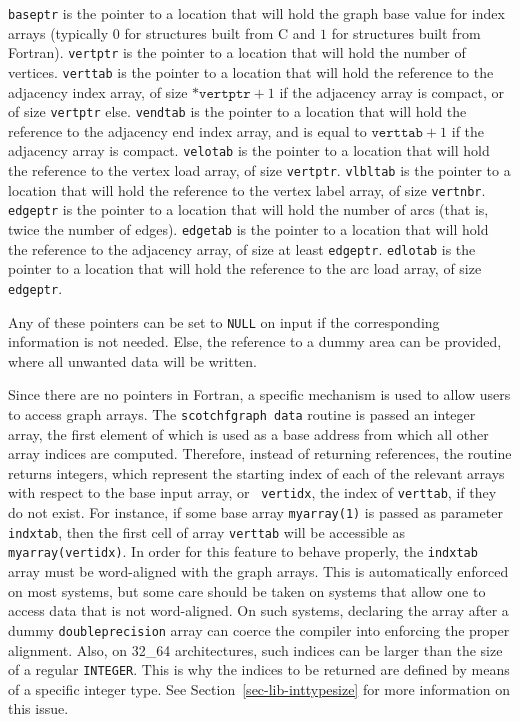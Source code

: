 \begin{itemize}
{\tt baseptr} is the pointer to a location that will hold the graph base
value for index arrays (typically $0$ for
structures built from C and $1$ for structures built from Fortran).
{\tt vertptr} is the pointer to a location that will hold the number of
vertices.
{\tt verttab} is the pointer to a location that will hold the reference to
the adjacency index array, of size $\mathtt{*vertptr} + 1$ if the
adjacency array is compact, or of size {\tt *vertptr} else.
{\tt vendtab} is the pointer to a location that will hold the reference to
the adjacency end index array, and is equal to $\mathtt{verttab} +
1$ if the adjacency array is compact.
{\tt velotab} is the pointer to a location that will hold the reference to
the vertex load array, of size {\tt *vertptr}.
{\tt vlbltab} is the pointer to a location that will hold the reference to
the vertex label array, of size {\tt vertnbr}.
{\tt edgeptr} is the pointer to a location that will hold the number of arcs
(that is, twice the number of edges).
{\tt edgetab} is the pointer to a location that will hold the reference to
the adjacency array, of size at least {\tt *edgeptr}.
{\tt edlotab} is the pointer to a location that will hold the reference to
the arc load array, of size {\tt *edgeptr}.

Any of these pointers can be set to {\tt NULL} on input if the
corresponding information is not needed. Else, the reference to a
dummy area can be provided, where all unwanted data will be written.

Since there are no pointers in Fortran, a specific mechanism is used
to allow users to access graph arrays. The {\tt scotchf\lbt graph\lbt
data} routine is passed an integer array, the first element of which is used
as a base address from which all other array indices are
computed. Therefore, instead of returning references, the routine
returns integers, which represent the starting index of each of the
relevant arrays with respect to the base input array, or {\tt
vertidx}, the index of {\tt verttab}, if they do not exist. For
instance, if some base array {\tt myarray\lbt (1)} is passed as
parameter {\tt indxtab}, then the first cell of array {\tt verttab}
will be accessible as {\tt myarray\lbt (vertidx)}.
In order for this feature to behave properly, the {\tt indxtab}
array must be word-aligned with the graph arrays. This is
automatically enforced on most systems, but some care should be
taken on systems that allow one to access data that is not
word-aligned. On such systems, declaring the array after a
dummy {\tt double\lbt precision} array can coerce the compiler
into enforcing the proper alignment. Also, on 32\_64 architectures,
such indices can be larger than the size of a regular
{\tt INTEGER}. This is why the indices to be returned are defined by
means of a specific integer type. See
Section~\ref{sec-lib-inttypesize} for more information on this
issue.
\end{itemize}

